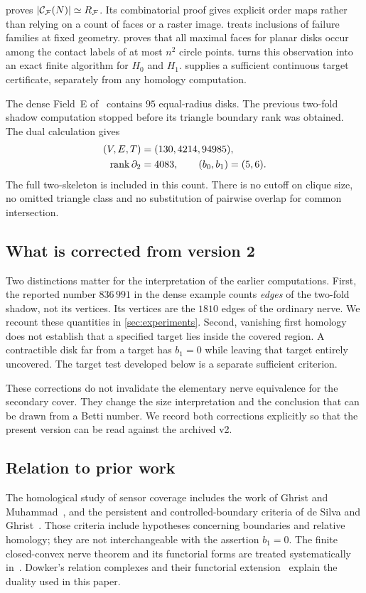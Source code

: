  proves $\left|\mathcal C_{\mathcal F}(N)\right|\simeq R_{\mathcal F}$. Its combinatorial proof gives explicit order maps rather than relying on a count of faces or a raster image.  treats inclusions of failure families at fixed geometry.  proves that all maximal faces for planar disks occur among the contact labels of at most $n^2$ circle points.  turns this observation into an exact finite algorithm for $H_0$ and $H_1$.  supplies a sufficient continuous target certificate, separately from any homology computation.

The dense Field~E of~\cite{original} contains $95$ equal-radius disks. The previous two-fold shadow computation stopped before its triangle boundary rank was obtained. The dual calculation gives
\begin{equation}\label{eq:E-result}
\begin{split}
(V,E,T)&=(130,4214,94985),\\
\operatorname{rank}\partial_2&=4083,\qquad (b_0,b_1)=(5,6).
\end{split}
\end{equation}
The full two-skeleton is included in this count. There is no cutoff on clique size, no omitted triangle class and no substitution of pairwise overlap for common intersection.

\subsection{What is corrected from version 2}
Two distinctions matter for the interpretation of the earlier computations. First, the reported number $836\,991$ in the dense example counts \emph{edges} of the two-fold shadow, not its vertices. Its vertices are the $1810$ edges of the ordinary nerve. We recount these quantities in \cref{sec:experiments}. Second, vanishing first homology does not establish that a specified target lies inside the covered region. A contractible disk far from a target has $b_1=0$ while leaving that target entirely uncovered. The target test developed below is a separate sufficient criterion.

These corrections do not invalidate the elementary nerve equivalence for the secondary cover. They change the size interpretation and the conclusion that can be drawn from a Betti number. We record both corrections explicitly so that the present version can be read against the archived v2.

\subsection{Relation to prior work}
The homological study of sensor coverage includes the work of Ghrist and Muhammad~\cite{ghrist}, and the persistent and controlled-boundary criteria of de Silva and Ghrist~\cite{desilva,controlled}. Those criteria include hypotheses concerning boundaries and relative homology; they are not interchangeable with the assertion $b_1=0$. The finite closed-convex nerve theorem and its functorial forms are treated systematically in~\cite{bauer}. Dowker's relation complexes and their functorial extension~\cite{dowker,chowdhury} explain the duality used in this paper.

